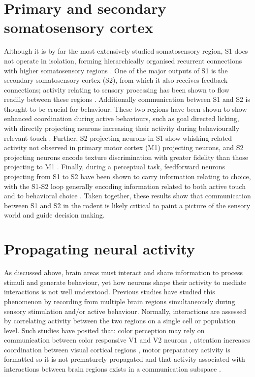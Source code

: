 \section{Primary and secondary somatosensory cortex}

Although it is by far the most extensively studied somatosensory region, S1 does not operate in isolation, forming hierarchically organised recurrent connections with higher somatosensory regions \cite{felleman_distributed_1991, kamatani_experience-dependent_2007, kwon_sensory_2016}. One of the major outputs of S1 is the secondary somatosensory cortex (S2), from which it also receives feedback connections; activity relating to sensory processing has been shown to flow readily between these regions \cite{aronoff_long-range_2010}. Additionally communication between S1 and S2 is thought to be crucial for behaviour. These two regions have been shown to show enhanced coordination during active behaviours, such as goal directed licking, with directly projecting neurons increasing their activity during behaviourally relevant touch \cite{chen_long-range_2016}. Further, S2 projecting neurons in S1 show whisking related activity not observed in primary motor cortex (M1) projecting neurons, and S2 projecting neurons encode texture discrimination with greater fidelity than those projecting to M1 \cite{chen_behaviour-dependent_2013}. Finally, during a perceptual task, feedforward neurons projecting from S1 to S2 have been shown to carry information relating to choice, with the S1-S2 loop generally encoding information related to both active touch and to behavioral choice \cite{kwon_sensory_2016}. Taken together, these results show that communication between S1 and S2 in the rodent is likely critical to paint a picture of the sensory world and guide decision making.  

\section{Propagating neural activity}

As discussed above, brain areas must interact and share information to process stimuli and generate behaviour, yet how neurons shape their activity to mediate interactions is not well understood. Previous studies have studied this phenomenon by recording from multiple brain regions simultaneously during sensory stimulation and/or active behaviour. Normally, interactions are assessed by correlating activity between the two regions on a single cell or population level. Such studies have posited that: color perception may rely on communication between color responsive V1 and V2 neurons \cite{roe_specificity_1999}, attention increases coordination between visual cortical regions \cite{ruff_attention_2016}, motor preparatory activity is formatted so it is not prematurely propagated \cite{kaufman_cortical_2014} and that activity associated with interactions between brain regions exists in a communication subspace \cite{semedo_cortical_2019}. 

